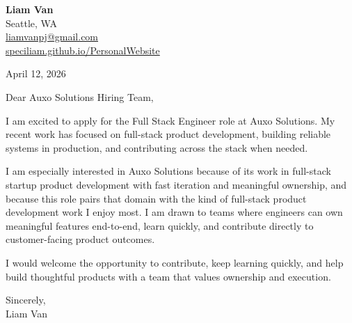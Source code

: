 \documentclass[letterpaper,11pt]{article}
\begin{document}
\begin{flushleft}
\textbf{\Large Liam Van} \\
Seattle, WA \\
\href{mailto:liamvanpj@gmail.com}{liamvanpj@gmail.com} \\
\href{https://speciliam.github.io/PersonalWebsite}{speciliam.github.io/PersonalWebsite}
\end{flushleft}

April 12, 2026

\noindent Dear Auxo Solutions Hiring Team,

\noindent I am excited to apply for the Full Stack Engineer role at Auxo Solutions. My recent work has focused on full-stack product development, building reliable systems in production, and contributing across the stack when needed.

\noindent I am especially interested in Auxo Solutions because of its work in full-stack startup product development with fast iteration and meaningful ownership, and because this role pairs that domain with the kind of full-stack product development work I enjoy most. I am drawn to teams where engineers can own meaningful features end-to-end, learn quickly, and contribute directly to customer-facing product outcomes.

\noindent I would welcome the opportunity to contribute, keep learning quickly, and help build thoughtful products with a team that values ownership and execution.

\noindent Sincerely, \\
Liam Van
\end{document}
